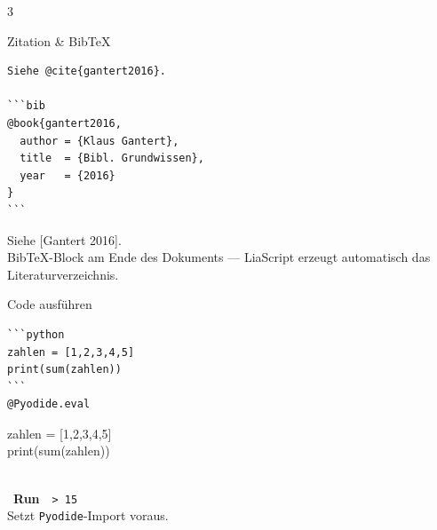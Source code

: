 \documentclass[a4paper,landscape,9pt]{extarticle}
\newcommand{\prevsm}[1]{{\footnotesize\color{muted} #1}}
\begin{document}
\begin{multicols}{3}
\begin{liacard}{Zitation \& BibTeX}
\begin{lstlisting}[language=lia]
Siehe @cite{gantert2016}.

```bib
@book{gantert2016,
  author = {Klaus Gantert},
  title  = {Bibl. Grundwissen},
  year   = {2016}
}
```
\end{lstlisting}
\tcblower
\prevsm{Siehe \textcolor{liagreen}{[Gantert 2016]}.\\[3pt]
{\footnotesize BibTeX-Block am Ende des Dokuments —
LiaScript erzeugt automatisch das Literaturverzeichnis.}}
\end{liacard}

\begin{liacard}{Code ausführen}
\begin{lstlisting}[language=lia]
```python
zahlen = [1,2,3,4,5]
print(sum(zahlen))
```
@Pyodide.eval
\end{lstlisting}
\tcblower
\prevsm{\colorbox{codebg}{\parbox{0.85\linewidth}{\ttfamily\scriptsize zahlen = [1,2,3,4,5]\\print(sum(zahlen))}}\\[2pt]
\faPlay~\textbf{Run}~~\textcolor{liagreen}{\texttt{> 15}}\\[2pt]
{\footnotesize Setzt \texttt{Pyodide}-Import voraus.}}
\end{liacard}

\end{multicols}
\end{document}
